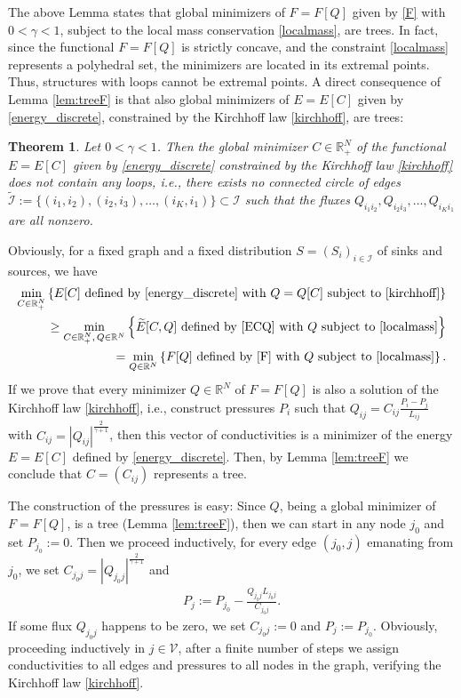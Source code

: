 \documentclass{article}
\numberwithin{equation}{section}
\newtheorem{theorem}{Theorem}%
\def\begproof{\noindent{\bf Proof: }}
\def\endproof{\par\rightline{\vrule height5pt width5pt depth0pt}\medskip}
\newcommand{\R}{\mathbb{R}}
\def\[{\begin{eqnarray*}}
\def\]{\end{eqnarray*}}
\begin{document}
The above Lemma states that global minimizers of $F=F[Q]$ given by \eqref{F} with $0 < \gamma < 1$,
subject to the local mass conservation \eqref{localmass}, are trees.
In fact, since the functional $F=F[Q]$ is strictly concave, and the constraint \eqref{localmass}
represents a polyhedral set, the minimizers are located in its extremal points.
Thus, structures with loops cannot be extremal points.
A direct consequence of Lemma \ref{lem:treeF} is that also global minimizers of $E=E[C]$ given by \eqref{energy_discrete},
constrained by the Kirchhoff law \eqref{kirchhoff}, are trees:
\vspace{2mm}

\begin{theorem}\label{thm:treeE}
Let $0 < \gamma < 1$.
Then the global minimizer $C\in\R^N_+$ of the functional $E = E[C]$ given by \eqref{energy_discrete} constrained by the Kirchhoff law \eqref{kirchhoff}
does not contain any loops, i.e., there exists no connected circle of edges $\widetilde{\mathcal{I}} := \{ (i_1,i_2), (i_2,i_3), \ldots, (i_K, i_1) \} \subset \mathcal{I}$
such that the fluxes $Q_{i_1 i_2}, Q_{i_2 i_3}, \dots, Q_{i_K i_1}$ are all nonzero.
\end{theorem}

\begproof
Obviously, for a fixed graph and a fixed distribution $S=(S_i)_{i\in\mathcal{I}}$ of sinks and sources, we have
\begin{align}
   \min_{C\in\R^N_+} \left\{ E[C] \mbox{ defined by \eqref{energy_discrete} with $Q=Q[C]$ subject to \eqref{kirchhoff}} \right\} \nonumber\\
   \geq
   \min_{C\in\R^N_+,\, Q\in\R^N} \left\{ \widetilde E[C,Q] \mbox{ defined by \eqref{ECQ} with $Q$ subject to \eqref{localmass}} \right\} \nonumber\\
   = \min_{Q\in\R^N} \left\{ F[Q] \mbox{ defined by \eqref{F} with $Q$ subject to \eqref{localmass}} \right\}.
\end{align}
If we prove that every minimizer $Q\in\R^N$ of $F=F[Q]$ is also a solution of the Kirchhoff law \eqref{kirchhoff},
i.e., construct pressures $P_i$ such that $Q_{ij} = C_{ij}\frac{P_i-P_j}{L_{ij}}$
with $C_{ij} = |Q_{ij}|^\frac{2}{\gamma+1}$, then this vector of conductivities %
is a minimizer of the energy $E=E[C]$ defined by \eqref{energy_discrete}.
Then, by Lemma \ref{lem:treeF} we conclude that $C=(C_{ij})$ represents a tree.

The construction of the pressures is easy: Since $Q$, being a global minimizer of $F = F[Q]$,
is a tree (Lemma \ref{lem:treeF}), then we can start in any node $j_0$ and set $P_{j_0}:=0$.
Then we proceed inductively, for every edge $(j_0,j)$ emanating from $j_0$, we set
$C_{j_0 j} = |Q_{j_0 j}|^\frac{2}{\gamma+1}$ and
\[
   P_j := P_{j_0} - \frac{Q_{j_0 j} L_{j_0 j}}{C_{j_0 j}}.
\]
If some flux $Q_{j_0 j}$ happens to be zero, we set $C_{j_0 j}:=0$ and $P_j := P_{j_0}$.
Obviously, proceeding inductively in $j\in\mathcal{V}$, after a finite number of steps we assign conductivities to all edges
and pressures to all nodes in the graph,
verifying the Kirchhoff law \eqref{kirchhoff}.
\endproof
\vspace{2mm}
\end{document}
